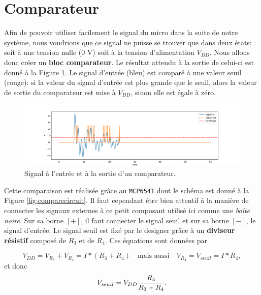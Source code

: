 \section{Comparateur}

Afin de pouvoir utiliser facilement le signal du micro dans la suite de notre système, nous voudrions que ce signal ne puisse se trouver que dans deux états: soit à une tension nulle (0 V)  soit à la tension d'alimentation $V_{DD}$.  Nous allons donc créer un \textbf{bloc comparateur}. Le résultat attendu à la sortie de celui-ci est donné à la Figure \ref{fig:compare}. Le signal d'entrée (bleu) est comparé à une valeur seuil (rouge): si la valeur du signal d'entrée est plus grande que le seuil, alors la valeur de sortie du comparateur est mise à $V_{DD}$, sinon elle est égale à zéro. 

\begin{figure}[h!]
    \centering
    \includegraphics[width=1\linewidth]{figures/club_compare.pdf}
    \caption{Signal à l'entrée et à la sortie d'un comparateur.}
    \label{fig:compare}
\end{figure}

Cette comparaison est réalisée grâce au \texttt{MCP6541} dont le schéma est donné à la Figure \ref{fig:comparecircuit}. Il faut cependant être bien attentif à la manière de connecter les signaux externes à ce petit composant utilisé ici comme une \textit{boîte noire}. Sur sa borne $[+]$, il faut connecter le signal seuil et sur sa borne $[-]$, le signal d'entrée. Le signal seuil est fixé par le designer grâce à un \textbf{diviseur résistif} composé de $R_3$ et de $R_4$. Ces équations sont données par

\begin{equation}
    V_{DD} = V_{R_3} + V_{R_4}  = I*(R_3 + R_4) \quad \text{mais aussi} \quad V_{R_4} = V_{seuil} =  I*R_4,
\end{equation}
et donc
\begin{equation}
    V_{seuil} = V_{DD} \frac{R_4}{R_3+R_4}. \\
\end{equation}

